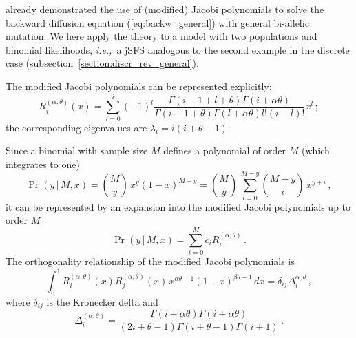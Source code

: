 \documentclass[preprint]{elsarticle}
\newcommand\given{{\,|\,}}
\newcommand\ie{{\it i.e.,}}
\begin{document}
\citet{Song12} already demonstrated the use of (modified) Jacobi polynomials to solve the backward diffusion equation (\ref{eq:backw_general}) with general bi-allelic mutation. We here apply the theory to a model with two populations and binomial likelihoods, \ie\ a jSFS analogous to the second example in the discrete case (subsection~\ref{section:discr_rev_general}). 

The modified Jacobi polynomials can be represented explicitly:
\begin{equation}
  R_i^{(\alpha,\theta)}(x)=\sum_{l=0}^i(-1)^l\frac{\Gamma(i-1+l+\theta)\Gamma(i+\alpha\theta)}{\Gamma(i-1+\theta)\Gamma(l+\alpha\theta)l!(i-l)!}x^l\,;
\end{equation}
the corresponding eigenvalues are $\lambda_i=i(i+\theta-1)$. 

Since a binomial with sample size $M$ defines a polynomial of order $M$ (which integrates to one) 
\begin{equation}
\Pr(y\given M,x)=\binom{M}{y}\,x^{y}(1-x)^{M-y}
=\binom{M}{y}\,\sum_{i=0}^{M-y} \binom{M-y}{i}\,x^{y+i}\,,
\end{equation}
it can be represented by an expansion into the modified Jacobi polynomials up to order $M$
\begin{equation}
\Pr(y\given M,x)=\sum_{i=0}^M c_i R_i^{(\alpha,\theta)}\,.
\end{equation}
The orthogonality relationship of the modified Jacobi polynomials is
\begin{equation}
    \int_0^1 R_i^{(\alpha,\theta)}(x) R_j^{(\alpha,\theta)}(x)\, x^{\alpha\theta-1}(1-x)^{\beta\theta-1}\,dx=\delta_{ij} \Delta_i^{\alpha,\theta}\,,
\end{equation}
where $\delta_{ij}$ is the Kronecker delta and 
\begin{equation}
    \Delta_i^{(\alpha,\theta)}=\frac{\Gamma(i+\alpha\theta)\Gamma(i+\alpha\theta)}{(2i+\theta-1)\Gamma(i+\theta-1)\Gamma(i+1)}\,.
\end{equation}
\end{document}
